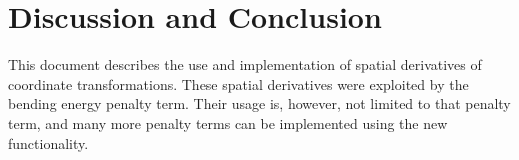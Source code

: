 \documentclass[]{article}
\begin{document}

\section{Discussion and Conclusion}

This document describes the use and implementation of spatial
derivatives of coordinate transformations. These spatial derivatives
were exploited by the bending energy penalty term. Their usage is,
however, not limited to that penalty term, and many more penalty
terms can be implemented using the new functionality.


%
%

\end{document}
